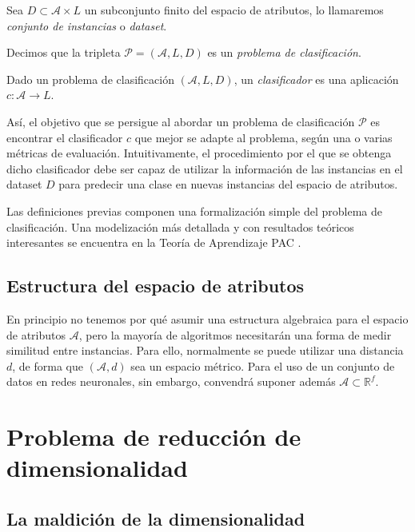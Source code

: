 Sea \(D\subset \mathcal A\times L\) un subconjunto finito del espacio de
atributos, lo llamaremos \emph{conjunto de instancias} o \emph{dataset}.

Decimos que la tripleta \(\mathcal P=\left(\mathcal A, L, D\right)\) es
un \emph{problema de clasificación}. 

Dado un problema de clasificación \(\left(\mathcal A, L, D\right)\), un
\emph{clasificador} es una aplicación \(c:\mathcal A\rightarrow L\).

Así, el objetivo que se persigue al abordar un problema de clasificación
\(\mathcal P\) es encontrar el clasificador \(c\) que mejor se adapte al
problema, según una o varias métricas de evaluación. Intuitivamente, el
procedimiento por el que se obtenga dicho clasificador debe ser capaz de
utilizar la información de las instancias en el dataset \(D\) para
predecir una clase en nuevas instancias del espacio de atributos.

Las definiciones previas componen una formalización simple del problema
de clasificación. Una modelización más detallada y con resultados
teóricos interesantes se encuentra en la Teoría de Aprendizaje PAC
\autocite{shwartz2014}.

\subsection{Estructura del espacio de
atributos}\label{estructura-del-espacio-de-atributos}

En principio no tenemos por qué asumir una estructura algebraica para el
espacio de atributos \(\mathcal A\), pero la mayoría de algoritmos
necesitarán una forma de medir similitud entre instancias. Para ello,
normalmente se puede utilizar una distancia \(d\), de forma que
\((\mathcal A,d)\) sea un espacio métrico. Para el uso de un conjunto de
datos en redes neuronales, sin embargo, convendrá suponer además
\(\mathcal A\subset \mathbb R^f\).

\section{Problema de reducción de
dimensionalidad}\label{problema-de-reducciuxf3n-de-dimensionalidad}

\subsection{La maldición de la
dimensionalidad}\label{la-maldiciuxf3n-de-la-dimensionalidad}

